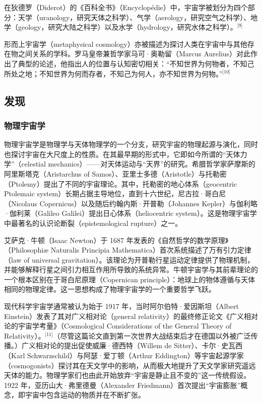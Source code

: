 在狄德罗（Diderot）的《百科全书》（Encyclopédie）中，宇宙学被划分为四个部分：天学（uranology，研究天体之科学）、气学（aerology，研究空气之科学）、地学（geology，研究大陆之科学）以及水学（hydrology，研究水体之科学）。\(^\text{[9]}\)

形而上宇宙学（metaphysical cosmology）亦被描述为探讨人类在宇宙中与其他存在物之间关系的学科。罗马皇帝兼哲学家马可·奥勒留（Marcus Aurelius）对此作出了典型的论述，他指出人的位置与认知密切相关：“不知世界为何物者，不知己所处之地；不知世界为何而存者，不知己为何人，亦不知世界为何物。”\(^\text{[10]}\)
\subsection{发现}
\subsubsection{物理宇宙学}
物理宇宙学是物理学与天体物理学的一个分支，研究宇宙的物理起源与演化，同时也探讨宇宙在大尺度上的性质。在其最早期的形式中，它即如今所谓的“天体力学”（celestial mechanics）——对天体运动与“天界”的研究。希腊哲学家萨摩斯的阿里斯塔克（Aristarchus of Samos）、亚里士多德（Aristotle）与托勒密（Ptolemy）提出了不同的宇宙理论。其中，托勒密的地心体系（geocentric Ptolemaic system）长期占据主导地位，直到十六世纪，尼古拉·哥白尼（Nicolaus Copernicus）以及随后约翰内斯·开普勒（Johannes Kepler）与伽利略·伽利莱（Galileo Galilei）提出日心体系（heliocentric system）。这是物理宇宙学中最著名的认识论断裂（epistemological rupture）之一。

艾萨克·牛顿（Isaac Newton）于 1687 年发表的《自然哲学的数学原理》（Philosophiæ Naturalis Principia Mathematica）首次系统描述了万有引力定律（law of universal gravitation）。该理论为开普勒行星运动定律提供了物理机制，并能够解释行星之间引力相互作用所导致的系统异常。牛顿宇宙学与其前辈理论的一个根本区别在于哥白尼原理（Copernican principle）：地球上的物体遵循与天体相同的物理定律。这一思想构成了物理宇宙学的一个重要哲学飞跃。

现代科学宇宙学通常被认为始于 1917 年，当时阿尔伯特·爱因斯坦（Albert Einstein）发表了其对广义相对论（general relativity）的最终修正论文《广义相对论的宇宙学考量》（Cosmological Considerations of the General Theory of Relativity）。\(^\text{[11]}\)（尽管这篇论文直到第一次世界大战结束后才在德国以外被广泛传播。）广义相对论的提出促使威廉·德西特（Willem de Sitter）、卡尔·史瓦西（Karl Schwarzschild）与阿瑟·爱丁顿（Arthur Eddington）等宇宙起源学家（cosmogonists）探讨其在天文学中的影响，从而极大地提升了天文学家研究遥远天体的能力。物理学家们也由此开始放弃“宇宙是静止且不变的”这一传统假设。1922 年，亚历山大·弗里德曼（Alexander Friedmann）首次提出“宇宙膨胀”概念，即宇宙中包含运动的物质并在不断扩张。


